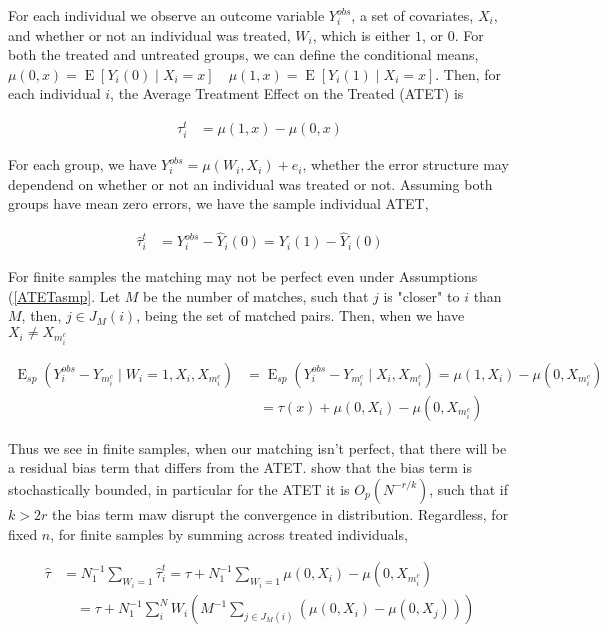 \documentclass{article}
\DeclareMathOperator{\E}{E}
\begin{document}
For each individual we observe an outcome variable $Y_{i}^{obs}$, a set of covariates, $X_{i}$, and whether or not an individual was treated, $W_{i}$, which is either $1$, or $0$. For both the treated and untreated groups, we can define the conditional means, $\mu(0,x) = \E[Y_{i}(0) \mid X_{i} = x]\quad \mu(1,x) = \E[Y_{i}(1) \mid X_{i} = x]$. Then, for each individual $i$, the Average Treatment Effect on the Treated (ATET) is

\begin{align*} \tau_{i}^{t} &= \mu(1,x) - \mu(0,x) \end{align*}

For each group, we have $Y_{i}^{obs} = \mu(W_{i},X_{i})+e_{i}$, whether the error structure may dependend on whether or not an individual was treated or not. Assuming both groups have mean zero errors, we have the sample individual ATET,

\begin{align*} \hat \tau_{i}^{t} &= Y_{i}^{obs}-\hat Y_{i}(0) = Y_{i}(1)-\hat Y_{i}(0) \end{align*}

For finite samples the matching may not be perfect even under Assumptions (\ref{ATETasmp}. Let $M$ be the number of matches, such that $j$ is "closer" to $i$ than $M$, then, $j \in J_{M}(i)$, being the set of matched pairs. Then, when we have $X_{i} \neq X_{m_{i}^{c}}$

\begin{align*} \E_{sp}(Y_{i}^{obs}-Y_{m_{i}^{c}} \mid W_{i} = 1, X_{i}, X_{m_{i}^{c}}) &= \E_{sp}(Y_{i}^{obs}-Y_{m_{i}^{c}} \mid X_{i}, X_{m_{i}^{c}}) = \mu(1,X_{i}) - \mu(0,X_{m_{i}^{c}}) \\
&\quad= \tau(x)+ \mu(0,X_{i}) -\mu(0,X_{m_{i}^{c}}) \end{align*}

Thus we see in finite samples, when our matching isn't perfect, that there will be a residual bias term that differs from the ATET. \cite{AnI:06} show that the bias term is stochastically bounded, in particular for the ATET it is $O_{p}(N^{-r/k})$, such that if $k > 2r$ the bias term maw disrupt the convergence in distribution. Regardless, for fixed $n$, for finite samples by summing across treated individuals,

\begin{align*} \hat \tau &= N_{1}^{-1}\sum_{W_{i} = 1}\hat \tau_{i}^{t} =\tau+N_{1}^{-1}\sum_{W_{i} = 1}\mu(0,X_{i}) -\mu(0,X_{m_{i}^{c}}) \\
&\quad= \tau+N_{1}^{-1}\sum_{i}^{N}W_{i}\left(M^{-1}\sum_{j \in J_{M}(i)}(\mu(0,X_{i}) - \mu(0,X_{j}))\right)
\end{align*}
\end{document}
